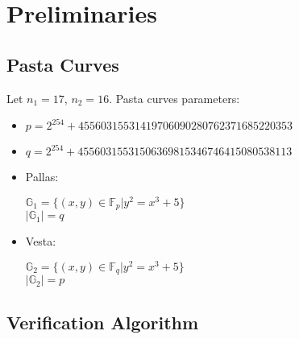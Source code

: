 \section{Preliminaries}
\label{section:preliminaries}

\subsection{Pasta Curves}

Let $n_1 = 17$, $n_2 = 16$.
Pasta curves parameters:
\begin{itemize}
	\item $p = 2^254 + 45560315531419706090280762371685220353$
	\item $q = 2^254 + 45560315531506369815346746415080538113$
	\item Pallas:
		\begin{center}
			$\mathbb{G}_1 = \{ (x, y) \in \mathbb{F}_p | y^2 = x^3 + 5 \}$ \\
			$|\mathbb{G}_1| = q$
		\end{center}
	\item Vesta:
		\begin{center}
			$\mathbb{G}_2 = \{ (x, y) \in \mathbb{F}_q | y^2 = x^3 + 5 \}$ \\
			$|\mathbb{G}_2| = p$
		\end{center}
\end{itemize}

\subsection{Verification Algorithm}

